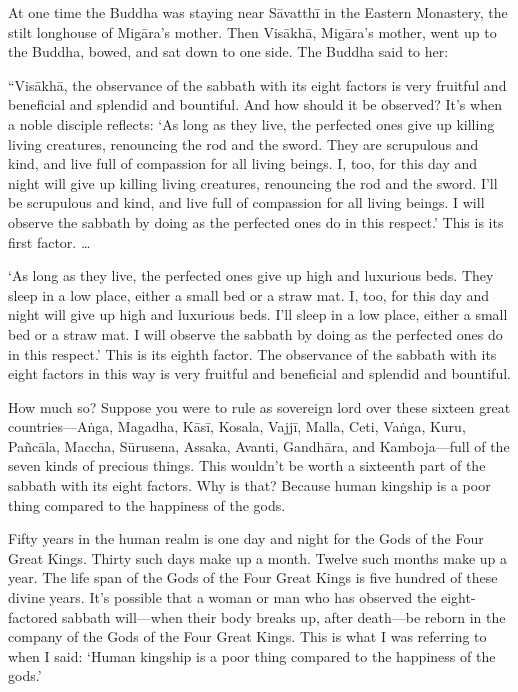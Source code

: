 \documentclass[12pt,openany]{book}%
\begin{document}
At one time the Buddha was staying near \textsanskrit{Sāvatthī} in the Eastern Monastery, the stilt longhouse of \textsanskrit{Migāra}’s mother. Then \textsanskrit{Visākhā}, \textsanskrit{Migāra}’s mother, went up to the Buddha, bowed, and sat down to one side. The Buddha said to her: 

“\textsanskrit{Visākhā}, the observance of the sabbath with its eight factors is very fruitful and beneficial and splendid and bountiful. And how should it be observed? It’s when a noble disciple reflects: ‘As long as they live, the perfected ones give up killing living creatures, renouncing the rod and the sword. They are scrupulous and kind, and live full of compassion for all living beings. I, too, for this day and night will give up killing living creatures, renouncing the rod and the sword. I’ll be scrupulous and kind, and live full of compassion for all living beings. I will observe the sabbath by doing as the perfected ones do in this respect.’ This is its first factor. … 

‘As long as they live, the perfected ones give up high and luxurious beds. They sleep in a low place, either a small bed or a straw mat. I, too, for this day and night will give up high and luxurious beds. I’ll sleep in a low place, either a small bed or a straw mat. I will observe the sabbath by doing as the perfected ones do in this respect.’ This is its eighth factor. The observance of the sabbath with its eight factors in this way is very fruitful and beneficial and splendid and bountiful. 

How much so? Suppose you were to rule as sovereign lord over these sixteen great countries—\textsanskrit{Aṅga}, Magadha, \textsanskrit{Kāsī}, Kosala, \textsanskrit{Vajjī}, Malla, Ceti, \textsanskrit{Vaṅga}, Kuru, \textsanskrit{Pañcāla}, Maccha, \textsanskrit{Sūrusena}, Assaka, Avanti, \textsanskrit{Gandhāra}, and Kamboja—full of the seven kinds of precious things. This wouldn’t be worth a sixteenth part of the sabbath with its eight factors. Why is that? Because human kingship is a poor thing compared to the happiness of the gods. 

Fifty years in the human realm is one day and night for the Gods of the Four Great Kings. Thirty such days make up a month. Twelve such months make up a year. The life span of the Gods of the Four Great Kings is five hundred of these divine years. It’s possible that a woman or man who has observed the eight-factored sabbath will—when their body breaks up, after death—be reborn in the company of the Gods of the Four Great Kings. This is what I was referring to when I said: ‘Human kingship is a poor thing compared to the happiness of the gods.’ 
\end{document}
